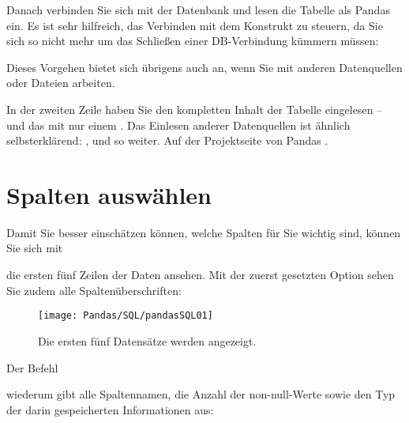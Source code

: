 Danach verbinden Sie sich mit der Datenbank und lesen die Tabelle als Pandas  ein. Es ist sehr hilfreich, das Verbinden mit dem Konstrukt  zu steuern, da Sie sich so nicht mehr um das Schließen einer DB-Verbindung kümmern müssen:

\medskip



\medskip

Dieses Vorgehen bietet sich übrigens auch an, wenn Sie mit anderen Datenquellen oder Dateien arbeiten.

In der zweiten Zeile haben Sie den kompletten Inhalt der Tabelle  eingelesen – und das mit nur einem . Das Einlesen anderer Datenquellen ist ähnlich selbsterklärend: ,  und so weiter. Auf der Projektseite von Pandas .

\section{Spalten auswählen}

Damit Sie besser einschätzen können, welche Spalten für Sie wichtig sind, können Sie sich mit

\medskip



\medskip

die ersten fünf Zeilen der Daten ansehen. Mit der zuerst gesetzten Option sehen Sie zudem alle Spaltenüberschriften:

\begin{figure}
	\texttt{[image: Pandas/SQL/pandasSQL01]}
	\caption{Die ersten fünf Datensätze werden angezeigt.}
\end{figure}


Der Befehl

\medskip


\medskip

wiederum gibt alle Spaltennamen, die Anzahl der non-null-Werte sowie den Typ der darin gespeicherten Informationen aus:

